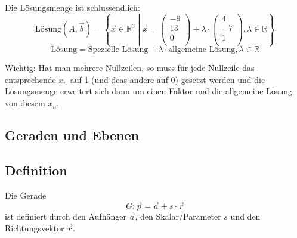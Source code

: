Die Lösungsmenge ist schlussendlich:
\[ \text{Lösung}(A, \vec{b}) = \left \{
    \vec{x} \in \mathbb{R}^3 \middle |
      \vec{x} = \left( \begin {array} {c} -9 \\ 13 \\ 0 \\ \end {array} \right) +
      \lambda \cdot \left( \begin {array} {c} 4 \\ -7 \\ 1 \\ \end {array} \right), 
      \lambda \in \mathbb{R}
  \right \} \]
\[ \text{Lösung} = \text{Spezielle Lösung} + \lambda \cdot \text{
allgemeine Lösung}, \lambda \in \mathbb{R} \]

Wichtig: Hat man mehrere Nullzeilen, so muss für jede Nullzeile das
entsprechende $x_n$ auf 1 (und deas andere auf 0) gesetzt werden
und die Lösungsmenge erweitert
sich dann um einen Faktor mal die allgemeine Lösung von diesem $x_n$.

\subsection{Geraden und Ebenen}
\subsection{Definition}
Die Gerade
\[ G : \vec{p} = \vec{a} + s \cdot \vec{r} \]
ist definiert durch den Aufhänger $\vec{a}$, den Skalar/Parameter $s$
und den Richtungsvektor $\vec{r}$.

